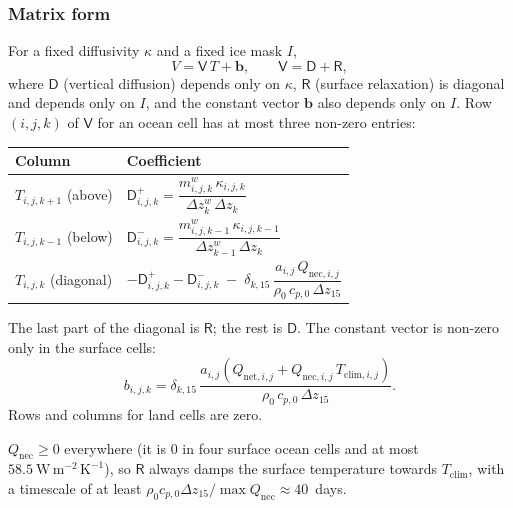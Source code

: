 \documentclass{article}
\begin{document}
\subsubsection*{Matrix form}
For a fixed diffusivity $\kappa$ and a fixed ice mask $I$,
\[
V = \mathsf{V}\, T + \mathbf{b}, \qquad \mathsf{V} = \mathsf{D} + \mathsf{R},
\]
where $\mathsf{D}$ (vertical diffusion) depends only on $\kappa$, $\mathsf{R}$ (surface relaxation) is diagonal and depends only on $I$, and the constant vector $\mathbf{b}$ also depends only on $I$.
Row $(i,j,k)$ of $\mathsf{V}$ for an ocean cell has at most three non-zero entries:
\begin{center}
\begin{tabular}{ll}
\hline
Column & Coefficient \\
\hline
$T_{i,j,k+1}$ (above) & $\mathsf{D}^+_{i,j,k} = \dfrac{m^w_{i,j,k}\, \kappa_{i,j,k}}{\Delta z^w_k\, \Delta z_k}$ \\[2.5ex]
$T_{i,j,k-1}$ (below) & $\mathsf{D}^-_{i,j,k} = \dfrac{m^w_{i,j,k-1}\, \kappa_{i,j,k-1}}{\Delta z^w_{k-1}\, \Delta z_k}$ \\[2.5ex]
$T_{i,j,k}$ (diagonal) & $-\mathsf{D}^+_{i,j,k} - \mathsf{D}^-_{i,j,k} \;-\; \delta_{k,15}\, \dfrac{a_{i,j}\, Q_{\text{nec},i,j}}{\rho_0\, c_{p,0}\, \Delta z_{15}}$ \\[2ex]
\hline
\end{tabular}
\end{center}
The last part of the diagonal is $\mathsf{R}$; the rest is $\mathsf{D}$.
The constant vector is non-zero only in the surface cells:
\[
b_{i,j,k} = \delta_{k,15}\, \frac{a_{i,j} \left( Q_{\text{net},i,j} + Q_{\text{nec},i,j}\, T_{\text{clim},i,j} \right)}{\rho_0\, c_{p,0}\, \Delta z_{15}}.
\]
Rows and columns for land cells are zero.

$Q_\text{nec} \ge 0$ everywhere (it is $0$ in four surface ocean cells and at most $58.5~\text{W}\,\text{m}^{-2}\,\text{K}^{-1}$), so $\mathsf{R}$ always damps the surface temperature towards $T_\text{clim}$, with a timescale of at least $\rho_0 c_{p,0} \Delta z_{15} / \max Q_\text{nec} \approx 40$~days.
\end{document}
